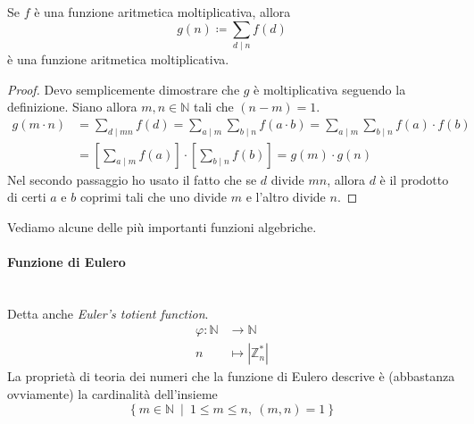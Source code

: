 \begin{proposizione}
	\label{somma_moltiplicativa}
	Se $f$ è una funzione aritmetica moltiplicativa, allora 
	\begin{equation*}
	g(n)\coloneqq \sum_{d\mid n}f(d)
	\end{equation*}
	è una funzione aritmetica moltiplicativa.
\end{proposizione}
\begin{proof}
	Devo semplicemente dimostrare che $g$ è moltiplicativa seguendo la definizione. Siano allora $m,n \in \mathbb{N}$ tali che $(n-m)=1$.
	\begin{align*}
	g(m \cdot n)&=\sum_{d\mid mn}f(d)=\sum_{a\mid m}\sum_{b\mid n}f(a\cdot b)=\sum_{a\mid m}\sum_{b\mid n}f(a)\cdot f(b) \\
	&=\left[\sum_{a\mid m}f(a)\right]\cdot\left[\sum_{b\mid n}f(b)\right]=g(m)\cdot g(n)
	\end{align*}
	Nel secondo passaggio ho usato il fatto che se $d$ divide $mn$, allora $d$ è il prodotto di certi $a$ e $b$ coprimi tali che uno divide $m$ e l'altro divide $n$.
\end{proof}
Vediamo alcune delle più importanti funzioni algebriche.
\paragraph{Funzione di Eulero} \ \\ Detta anche \textit{Euler's totient function}.
\begin{align*}
\varphi: \mathbb{N}&\longrightarrow \mathbb{N}\\
n &\longmapsto |\mathbb{Z}_n^*|
\end{align*}
La proprietà di teoria dei numeri che la funzione di Eulero descrive è (abbastanza ovviamente) la cardinalità dell'insieme
\begin{equation*}
\left\{m\in\mathbb{N} \ \middle| \ 1\leq m \leq n, \ (m,n)=1\right\}
\end{equation*}
